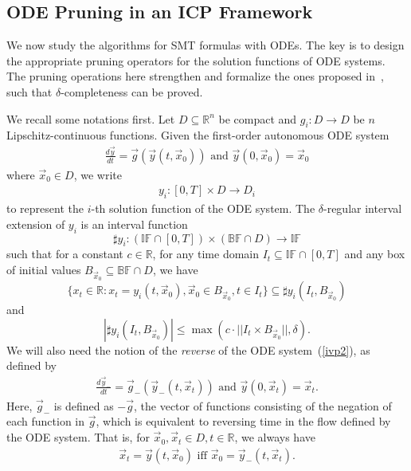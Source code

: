 \documentclass[11pt]{article}
\begin{document}
\subsection{ODE Pruning in an ICP Framework}

We now study the algorithms for SMT formulas with ODEs. The key is to design the appropriate pruning operators for the solution functions of ODE systems. The pruning operations here strengthen and formalize the ones proposed in~\cite{Eggers2008,Eggers2011,DBLP:conf/cp/GoldsztejnMEH10}, such that $\delta$-completeness can be proved. 

We recall some notations first. Let $D\subseteq \mathbb{R}^n$ be compact and $g_i: D\rightarrow D$ be $n$ Lipschitz-continuous functions. Given the first-order autonomous ODE system
\begin{eqnarray}\label{ivp2}
\frac{d \vec y}{dt} = \vec g(\vec y(t, \vec x_0)) \mbox{ and }\vec y(0, \vec x_0) = \vec x_0
\end{eqnarray}
where $\vec x_0\in D$, we write
\begin{eqnarray*}\label{ivp_solution}
y_i: [0, T]\times D\rightarrow D_i
\end{eqnarray*}
to represent the $i$-th solution function of the ODE system. The $\delta$-regular interval extension of $y_i$ is an interval function
$$\sharp y_i: (\mathbb{IF}\cap [0,T])\times (\mathbb{BF}\cap D) \rightarrow \mathbb{IF}$$
such that for a constant $c\in \mathbb{R}$, for any time domain $I_t\subseteq \mathbb{IF}\cap [0,T]$ and any box of initial values $B_{\vec x_0}\subseteq \mathbb{BF}\cap D$, we have
$$\{x_{t}\in \mathbb{R}: x_{t} = y_i(t, \vec x_0), \vec x_0\in B_{\vec x_0}, t\in I_t\}\subseteq \sharp y_i(I_t, B_{\vec x_0})$$
and
$$|\sharp y_i(I_t, B_{\vec x_0})|\leq \max(c\cdot||I_t\times B_{\vec x_0}||, \delta).$$
We will also need the notion of the {\em reverse} of the ODE system~(\ref{ivp2}), as defined by
\begin{eqnarray}\label{ivpi2}
\frac{d \vec y_-}{dt} = \vec g_-(\vec y_-(t, \vec x_t)) \mbox{ and }\vec y(0, \vec x_t) = \vec x_t.
\end{eqnarray}
Here, $\vec{g}_-$ is defined as $-\vec g$, the vector of functions consisting of the negation of each function in $\vec g$, which is equivalent to reversing time in the flow defined by the ODE system. That is, for $\vec x_0,\vec x_t\in D, t\in \mathbb{R}$, we always have
\begin{eqnarray}
\vec x_t = \vec y (t, \vec x_0)\mbox{ iff }\vec x_0 = \vec y_-(t,\vec x_t).
\end{eqnarray}
\end{document}
